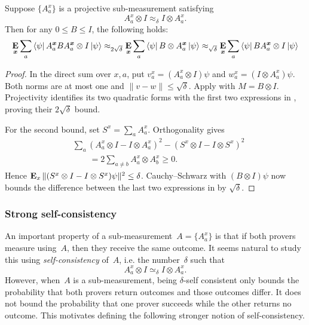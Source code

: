 \documentclass[11pt]{article}
\theoremstyle{definition}
\newcommand{\E}{\mathop{\bf E\/}}
\newcommand{\ot}{\otimes}
\newcommand{\bx}{{\boldsymbol{x}}}
\begin{document}
\begin{proposition}  \label{prop:switch-sandwich}
  Suppose $\{A^x_a\}$ is a projective sub-measurement
  satisfying
  \begin{equation}
    A^x_a \ot I \approx_{\delta} I \ot A^x_a. \label{eq:Aapproxd}
  \end{equation}
  Then for any $0 \leq B \leq I$, the following holds:
  \begin{equation}
    \E_{\bx}\sum_a \bra{\psi} A^{\bx}_a B A^{\bx}_a \ot I \ket{\psi}
    \approx_{2\sqrt{\delta}} \E_{\bx} \sum_a \bra{\psi} B
    \ot A^{\bx}_a
    \ket{\psi} \approx_{\sqrt{\delta}} \E_{\bx} \sum_a \bra{\psi}
    BA^{\bx}_a \ot I \ket{\psi} \label{eq:switch-sandwich} \end{equation}

\end{proposition}
\begin{proof}
In the direct sum over $x,a$, put
$v_a^x=(A_a^x\otimes I)\psi$ and
$w_a^x=(I\otimes A_a^x)\psi$.  Both norms are at most one and
$\|v-w\|\leq\sqrt\delta$.  Apply
 with $M=B\otimes I$.
Projectivity identifies its two quadratic forms with the first two
expressions in , proving their
$2\sqrt\delta$ bound.

For the second bound, set $S^x=\sum_aA_a^x$.  Orthogonality gives
\begin{align*}
 &\sum_a(A_a^x\otimes I-I\otimes A_a^x)^2
       -(S^x\otimes I-I\otimes S^x)^2\\
 &\qquad=2\sum_{a\ne b}A_a^x\otimes A_b^x\geq0.
\end{align*}
Hence $\E_x\|(S^x\otimes I-I\otimes S^x)\psi\|^2\leq\delta$.
Cauchy--Schwarz with $(B\otimes I)\psi$ now bounds the difference
between the last two expressions in  by
$\sqrt\delta$.
\end{proof}


\subsubsection{Strong self-consistency}

An important property of a sub-measurement~$A = \{A^x_a\}$
is that if both provers measure using~$A$,
then they receive the same outcome.
It seems natural to study this using \emph{self-consistency} of~$A$, i.e. the number~$\delta$ such that
\begin{equation*}
A^x_a \ot I \simeq_{\delta} I \ot A^x_a.
\end{equation*}
However, when~$A$ is a sub-measurement,
being $\delta$-self consistent only bounds the probability that
both provers return outcomes and those outcomes differ.  It does not
bound the probability that one prover succeeds while the other
returns no outcome.
This motivates defining the following stronger notion of self-consistency.
\end{document}
